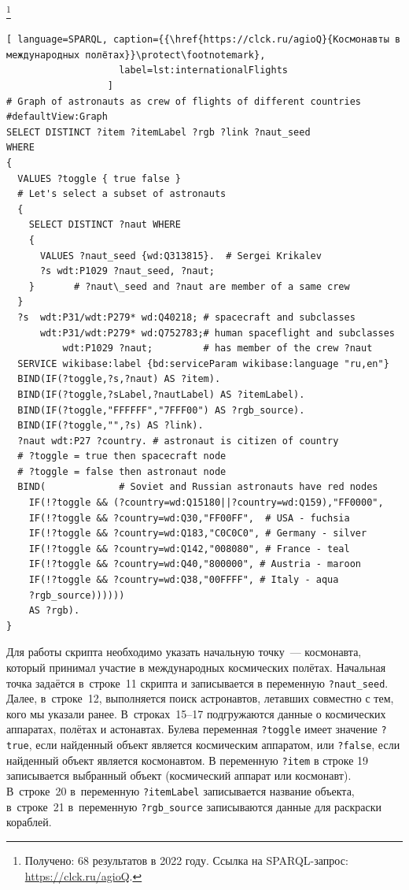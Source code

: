 \footnote[17][2\baselineskip]{Получено: 68 результатов в 2022 году. Ссылка на SPARQL-запрос: \href{https://clck.ru/agioQ}{https://clck.ru/agioQ}.}
\begin{lstlisting}[ language=SPARQL, caption={{\href{https://clck.ru/agioQ}{Космонавты в международных полётах}}\protect\footnotemark}, 
                    label=lst:internationalFlights
                  ]
# Graph of astronauts as crew of flights of different countries
#defaultView:Graph
SELECT DISTINCT ?item ?itemLabel ?rgb ?link ?naut_seed
WHERE
{ 
  VALUES ?toggle { true false }
  # Let's select a subset of astronauts
  {
    SELECT DISTINCT ?naut WHERE
    { 
      VALUES ?naut_seed {wd:Q313815}.  # Sergei Krikalev
      ?s wdt:P1029 ?naut_seed, ?naut;  
    }       # ?naut\_seed and ?naut are member of a same crew
  }
  ?s  wdt:P31/wdt:P279* wd:Q40218; # spacecraft and subclasses
      wdt:P31/wdt:P279* wd:Q752783;# human spaceflight and subclasses
          wdt:P1029 ?naut;         # has member of the crew ?naut    
  SERVICE wikibase:label {bd:serviceParam wikibase:language "ru,en"}
  BIND(IF(?toggle,?s,?naut) AS ?item).
  BIND(IF(?toggle,?sLabel,?nautLabel) AS ?itemLabel).
  BIND(IF(?toggle,"FFFFFF","7FFF00") AS ?rgb_source).
  BIND(IF(?toggle,"",?s) AS ?link).
  ?naut wdt:P27 ?country. # astronaut is citizen of country 
  # ?toggle = true then spacecraft node
  # ?toggle = false then astronaut node
  BIND(             # Soviet and Russian astronauts have red nodes
    IF(!?toggle && (?country=wd:Q15180||?country=wd:Q159),"FF0000",
    IF(!?toggle && ?country=wd:Q30,"FF00FF",  # USA - fuchsia
    IF(!?toggle && ?country=wd:Q183,"C0C0C0", # Germany - silver
    IF(!?toggle && ?country=wd:Q142,"008080", # France - teal
    IF(!?toggle && ?country=wd:Q40,"800000", # Austria - maroon
    IF(!?toggle && ?country=wd:Q38,"00FFFF", # Italy - aqua
    ?rgb_source))))))
    AS ?rgb).
}
\end{lstlisting}

Для работы скрипта необходимо указать начальную точку~--- космонавта, 
который принимал участие в международных космических полётах. 
Начальная точка задаётся в~строке~11 скрипта и записывается в переменную \lstinline|?naut_seed|. 
Далее, в~строке~12, выполняется поиск астронавтов, 
летавших совместно с тем, кого мы указали ранее. 
В~строках~15--17 подгружаются данные о космических аппаратах, полётах и астонавтах. 
Булева переменная \lstinline|?toggle| имеет значение \lstinline|?true|, 
если найденный объект является космическим аппаратом, 
или \lstinline|?false|, 
если найденный объект является космонавтом. 
В переменную \lstinline|?item| в строке 19 записывается выбранный объект (космический аппарат или космонавт). 
В~строке~20 в~переменную \lstinline|?itemLabel| записывается название объекта, 
в~строке~21 в~переменную \lstinline|?rgb_source| записываются данные для раскраски кораблей. 

